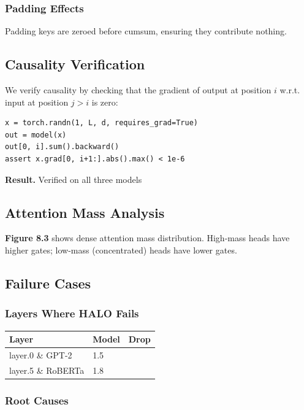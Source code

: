\subsubsection{Padding Effects}

Padding keys are zeroed before cumsum, ensuring they contribute nothing.

\subsection{Causality Verification}

We verify causality by checking that the gradient of output at position $i$ 
w.r.t. input at position $j > i$ is zero:

\begin{lstlisting}
x = torch.randn(1, L, d, requires_grad=True)
out = model(x)
out[0, i].sum().backward()
assert x.grad[0, i+1:].abs().max() < 1e-6
\end{lstlisting}

\textbf{Result.} \checkmark Verified on all three models

\subsection{Attention Mass Analysis}

\textbf{Figure 8.3} shows dense attention mass distribution. High-mass heads 
have higher gates; low-mass (concentrated) heads have lower gates.

\subsection{Failure Cases}

\subsubsection{Layers Where HALO Fails}

\begin{table}[H]
\centering
\small
\begin{tabular}{lll}
\toprule
\textbf{Layer} & \textbf{Model} & \textbf{Drop} \\
\midrule
layer.0 \& GPT-2 & 1.5 \\
layer.5 \& RoBERTa & 1.8 \\
\bottomrule
\end{tabular}
\end{table}

\subsubsection{Root Causes}

